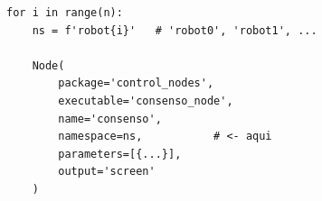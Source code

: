 \begin{figure}[t]
\centering
\begin{lstlisting}[style=python,
    caption={Asignación de namespace a un nodo desde el launch file.},
    label={lst:ns_node}]
for i in range(n):
    ns = f'robot{i}'   # 'robot0', 'robot1', ...

    Node(
        package='control_nodes',
        executable='consenso_node',
        name='consenso',
        namespace=ns,           # <- aqui
        parameters=[{...}],
        output='screen'
    )
\end{lstlisting}
\end{figure}
